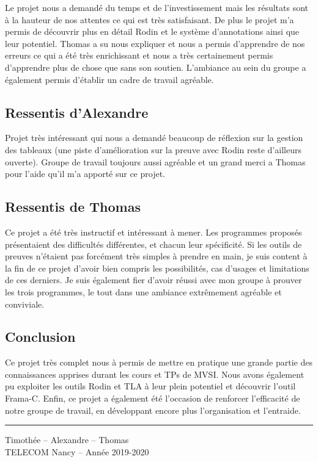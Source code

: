 \documentclass[a4paper, 11pt]{article}
\theoremstyle{mystyle}
\begin{document}
Le projet nous a demandé du temps et de l'investissement mais les résultats sont à la hauteur de nos attentes ce qui est très satisfaisant. De plus le projet m'a permis de découvrir plus en détail Rodin et le système d'annotations ainsi que leur potentiel. Thomas a su nous expliquer et nous a permis d'apprendre de nos erreurs ce qui a été très enrichissant et nous a très certainement permis d'apprendre plus de chose que sans son soutien. L'ambiance au sein du groupe a également permis d'établir un cadre de travail agréable.
\subsection{Ressentis d'Alexandre}

Projet très intéressant qui nous a demandé beaucoup de réflexion sur la gestion des tableaux (une piste d'amélioration sur la preuve avec Rodin reste d'ailleurs ouverte). Groupe de travail toujours aussi agréable et un grand merci a Thomas pour l'aide qu'il m'a apporté sur ce projet. 

\subsection{Ressentis de Thomas}

Ce projet a été très instructif et intéressant à mener. Les programmes proposés présentaient des difficultés différentes, et chacun leur spécificité. Si les outils de preuves n'étaient pas forcément très simples à prendre en main, je suis content à la fin de ce projet d'avoir bien compris les possibilités, cas d'usages et limitations de ces derniers. Je suis également fier d'avoir réussi avec mon groupe à prouver les trois programmes, le tout dans une ambiance extrêmement agréable et conviviale.

\subsection{Conclusion}

Ce projet très complet nous à permis de mettre en pratique une grande partie des connaissances apprises durant les cours et TPs de MVSI. Nous avons également pu exploiter les outils Rodin et TLA à leur plein potentiel et découvrir l'outil Frama-C. Enfin, ce projet a également été l'occasion de renforcer l'efficacité de notre groupe de travail, en développant encore plus l'organisation et l'entraide.

\vfill

\rule{\linewidth}{1pt}
\begin{center}\small
    Timothée  -- Alexandre  -- Thomas \\
    TELECOM Nancy -- Année 2019-2020
\end{center}
\end{document}
